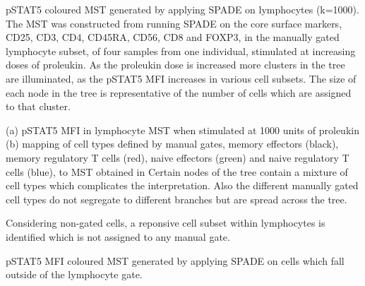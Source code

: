 {pSTAT5 coloured \gls{MST} generated by applying \gls{SPADE} on lymphocytes (k=1000).}
{
  The \gls{MST} was constructed from running \gls{SPADE} on the core surface markers,
  CD25, CD3, CD4, CD45RA, CD56, CD8 and FOXP3, in the manually gated lymphocyte subset, of four samples from one individual,
  stimulated at increasing doses of proleukin.
  As the proleukin dose is increased more clusters in the tree are illuminated, as the pSTAT5 MFI increases in various cell subsets.
  The size of each node in the tree is representative of the number of cells which are assigned to that cluster. 
}


{(a) pSTAT5 MFI in lymphocyte \gls{MST} when stimulated at 1000 units of proleukin (b) mapping of cell types defined by manual gates, memory effectors (black), memory regulatory T cells (red), naive effectors (green) and naive regulatory T cells (blue), to \gls{MST} obtained in }
{
  Certain nodes of the tree contain a mixture of cell types which complicates the interpretation.
  Also the different manually gated cell types do not segregate to different branches but are spread across the tree.
}

{ Considering non-gated cells, a reponsive cell subset within lymphocytes is identified which is not assigned to any manual gate.  }
{
}

{pSTAT5 MFI coloured \gls{MST} generated by applying \gls{SPADE} on cells which fall outside of the lymphocyte gate.}
{
}
%

